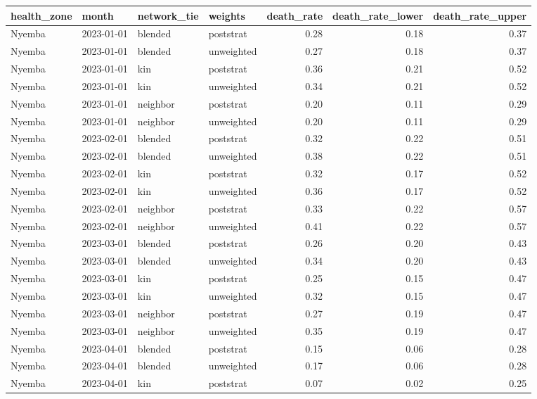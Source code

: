 \begin{table}[ht]
\centering
\begin{tabular}{llllrrr}
  \toprule
health\_zone & month & network\_tie & weights & death\_rate & death\_rate\_lower & death\_rate\_upper \\ 
  \midrule
Nyemba & 2023-01-01 & blended & poststrat & 0.28 & 0.18 & 0.37 \\ 
  Nyemba & 2023-01-01 & blended & unweighted & 0.27 & 0.18 & 0.37 \\ 
  Nyemba & 2023-01-01 & kin & poststrat & 0.36 & 0.21 & 0.52 \\ 
  Nyemba & 2023-01-01 & kin & unweighted & 0.34 & 0.21 & 0.52 \\ 
  Nyemba & 2023-01-01 & neighbor & poststrat & 0.20 & 0.11 & 0.29 \\ 
  Nyemba & 2023-01-01 & neighbor & unweighted & 0.20 & 0.11 & 0.29 \\ 
  Nyemba & 2023-02-01 & blended & poststrat & 0.32 & 0.22 & 0.51 \\ 
  Nyemba & 2023-02-01 & blended & unweighted & 0.38 & 0.22 & 0.51 \\ 
  Nyemba & 2023-02-01 & kin & poststrat & 0.32 & 0.17 & 0.52 \\ 
  Nyemba & 2023-02-01 & kin & unweighted & 0.36 & 0.17 & 0.52 \\ 
  Nyemba & 2023-02-01 & neighbor & poststrat & 0.33 & 0.22 & 0.57 \\ 
  Nyemba & 2023-02-01 & neighbor & unweighted & 0.41 & 0.22 & 0.57 \\ 
  Nyemba & 2023-03-01 & blended & poststrat & 0.26 & 0.20 & 0.43 \\ 
  Nyemba & 2023-03-01 & blended & unweighted & 0.34 & 0.20 & 0.43 \\ 
  Nyemba & 2023-03-01 & kin & poststrat & 0.25 & 0.15 & 0.47 \\ 
  Nyemba & 2023-03-01 & kin & unweighted & 0.32 & 0.15 & 0.47 \\ 
  Nyemba & 2023-03-01 & neighbor & poststrat & 0.27 & 0.19 & 0.47 \\ 
  Nyemba & 2023-03-01 & neighbor & unweighted & 0.35 & 0.19 & 0.47 \\ 
  Nyemba & 2023-04-01 & blended & poststrat & 0.15 & 0.06 & 0.28 \\ 
  Nyemba & 2023-04-01 & blended & unweighted & 0.17 & 0.06 & 0.28 \\ 
  Nyemba & 2023-04-01 & kin & poststrat & 0.07 & 0.02 & 0.25 \\ 

\end{tabular}
\end{table}
